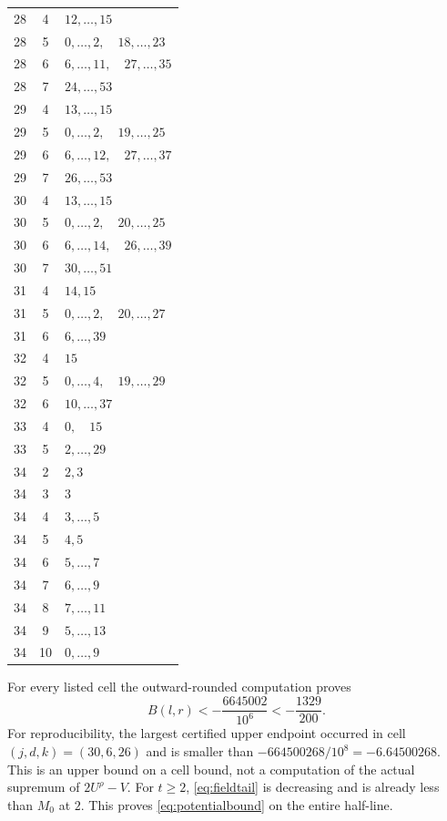 \begin{longtable}{ccl}
28 & 4 & $12,\ldots,15$\\
28 & 5 & $0,\ldots,2,\quad 18,\ldots,23$\\
28 & 6 & $6,\ldots,11,\quad 27,\ldots,35$\\
28 & 7 & $24,\ldots,53$\\
29 & 4 & $13,\ldots,15$\\
29 & 5 & $0,\ldots,2,\quad 19,\ldots,25$\\
29 & 6 & $6,\ldots,12,\quad 27,\ldots,37$\\
29 & 7 & $26,\ldots,53$\\
30 & 4 & $13,\ldots,15$\\
30 & 5 & $0,\ldots,2,\quad 20,\ldots,25$\\
30 & 6 & $6,\ldots,14,\quad 26,\ldots,39$\\
30 & 7 & $30,\ldots,51$\\
31 & 4 & $14,15$\\
31 & 5 & $0,\ldots,2,\quad 20,\ldots,27$\\
31 & 6 & $6,\ldots,39$\\
32 & 4 & $15$\\
32 & 5 & $0,\ldots,4,\quad 19,\ldots,29$\\
32 & 6 & $10,\ldots,37$\\
33 & 4 & $0,\quad 15$\\
33 & 5 & $2,\ldots,29$\\
34 & 2 & $2,3$\\
34 & 3 & $3$\\
34 & 4 & $3,\ldots,5$\\
34 & 5 & $4,5$\\
34 & 6 & $5,\ldots,7$\\
34 & 7 & $6,\ldots,9$\\
34 & 8 & $7,\ldots,11$\\
34 & 9 & $5,\ldots,13$\\
34 & 10 & $0,\ldots,9$\\
\end{longtable}
\endgroup
For every listed cell the outward-rounded computation proves
\begin{equation}\label{eq:cellcertificate}
 B(l,r)<-\frac{6645002}{10^6}<-\frac{1329}{200}.
\end{equation}
For reproducibility, the largest certified upper endpoint occurred in
cell $(j,d,k)=(30,6,26)$ and is smaller than
$-664500268/10^8=-6.64500268$. This is an upper bound on a cell bound,
not a computation of the actual supremum of $2U^\rho-V$.
For $t\ge2$, \eqref{eq:fieldtail} is decreasing and is already less than
$M_0$ at $2$. This proves \eqref{eq:potentialbound} on the entire
half-line.


